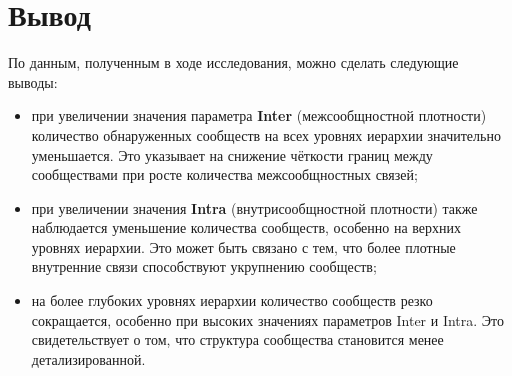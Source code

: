 \section*{Вывод}

По данным, полученным в ходе исследования, можно сделать следующие выводы:
\begin{itemize}
\item при увеличении значения параметра \textbf{Inter} (межсообщностной плотности) количество обнаруженных сообществ на всех уровнях иерархии значительно уменьшается. Это указывает на снижение чёткости границ между сообществами при росте количества межсообщностных связей;
\item при увеличении значения \textbf{Intra} (внутрисообщностной плотности) также наблюдается уменьшение количества сообществ, особенно на верхних уровнях иерархии. Это может быть связано с тем, что более плотные внутренние связи способствуют укрупнению сообществ;
\item на более глубоких уровнях иерархии количество сообществ резко сокращается, особенно при высоких значениях параметров Inter и Intra. Это свидетельствует о том, что структура сообщества становится менее детализированной.
\end{itemize}
